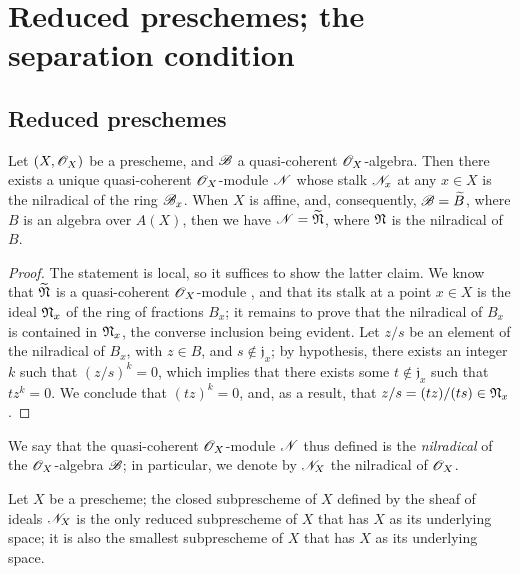 \section{Reduced preschemes; the separation condition}
\label{section:I.5}

\subsection{Reduced preschemes}
\label{subsection:I.5.1}

\begin{proposition}[5.1.1]
\label{I.5.1.1}
Let $(X,\mathscr{O}_X)$ be a prescheme, and $\mathscr{B}$ a quasi-coherent $\mathscr{O}_X$-algebra.
Then there exists a unique quasi-coherent $\mathscr{O}_X$-module $\mathscr{N}$ whose stalk $\mathscr{N}_x$ at any $x\in X$ is the nilradical of the ring $\mathscr{B}_x$.
When $X$ is affine, and, consequently, $\mathscr{B}=\widetilde{B}$, where $B$ is an algebra over $A(X)$, then we have $\mathscr{N}=\widetilde{\mathfrak{N}}$, where $\mathfrak{N}$ is the nilradical of $B$.
\end{proposition}

\begin{proof}
The statement is local, so it suffices to show the latter claim.
We know that $\widetilde{\mathfrak{N}}$ is a quasi-coherent $\mathscr{O}_X$-module , and that its stalk at a point $x\in X$ is the ideal $\mathfrak{N}_x$ of the ring of fractions $B_x$;
it remains to prove that the nilradical of $B_x$ is contained in $\mathfrak{N}_x$, the converse inclusion being evident.
Let $z/s$ be an element of the nilradical of $B_x$, with $z\in B$, and $s\not\in\mathfrak{j}_x$;
by hypothesis, there exists an integer $k$ such that $(z/s)^k=0$, which implies that there exists some $t\not\in\mathfrak{j}_x$ such that $tz^k=0$.
We conclude that $(tz)^k=0$, and, as a result, that $z/s=(tz)/(ts)\in\mathfrak{N}_x$.
\end{proof}

We say that the quasi-coherent $\mathscr{O}_X$-module $\mathscr{N}$ thus defined is the \emph{nilradical} of the $\mathscr{O}_X$-algebra $\mathscr{B}$; in particular, we denote by $\mathscr{N}_X$ the nilradical of $\mathscr{O}_X$.

\begin{corollary}[5.1.2]
\label{I.5.1.2}
Let $X$ be a prescheme;
the closed subprescheme of $X$ defined by the sheaf of ideals $\mathscr{N}_X$ is the only reduced subprescheme  of $X$ that has $X$ as its underlying space;
it is also the smallest subprescheme of $X$ that has $X$ as its underlying space.
\end{corollary}

